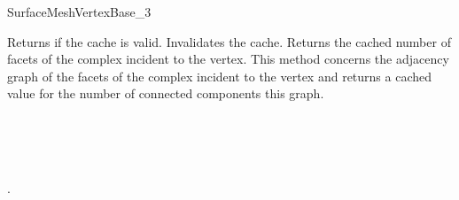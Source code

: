 \begin{ccRefConcept}{SurfaceMeshVertexBase_3}
\ccCreation
{}  %


\ccOperations


{Returns  if the cache is valid.}
\ccGlue
{}
{Invalidates the cache.}
\ccGlue
{}
{Returns the cached number of facets of the complex incident to the vertex.}
\ccGlue
{}
{ This method concerns the adjacency
graph of  the facets of the complex incident to the vertex
and returns a cached value for the number of connected components this graph.}

\ccHasModels

 \\


\ccSeeAlso

 \\
 \\
.





\end{ccRefConcept}


